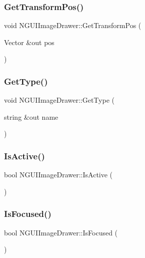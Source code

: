 \subsubsection{\texorpdfstring{Get\+Transform\+Pos()}{GetTransformPos()}}
{\footnotesize\ttfamily void N\+G\+U\+I\+Image\+Drawer\+::\+Get\+Transform\+Pos (\begin{DoxyParamCaption}\item[{Vector \&out}]{pos }\end{DoxyParamCaption})}

\hypertarget{class_n_g_u_i_image_drawer_a57b78d51ac65ee923dcddadd87379baa}{}\label{class_n_g_u_i_image_drawer_a57b78d51ac65ee923dcddadd87379baa} 
\subsubsection{\texorpdfstring{Get\+Type()}{GetType()}}
{\footnotesize\ttfamily void N\+G\+U\+I\+Image\+Drawer\+::\+Get\+Type (\begin{DoxyParamCaption}\item[{string \&out}]{name }\end{DoxyParamCaption})}

\hypertarget{class_n_g_u_i_image_drawer_a51bd7012d812b9ebd598efa88b53d0c3}{}\label{class_n_g_u_i_image_drawer_a51bd7012d812b9ebd598efa88b53d0c3} 
\subsubsection{\texorpdfstring{Is\+Active()}{IsActive()}}
{\footnotesize\ttfamily bool N\+G\+U\+I\+Image\+Drawer\+::\+Is\+Active (\begin{DoxyParamCaption}{ }\end{DoxyParamCaption})}

\hypertarget{class_n_g_u_i_image_drawer_aed9172eed97574a393de7a20bf55e6b0}{}\label{class_n_g_u_i_image_drawer_aed9172eed97574a393de7a20bf55e6b0} 
\subsubsection{\texorpdfstring{Is\+Focused()}{IsFocused()}}
{\footnotesize\ttfamily bool N\+G\+U\+I\+Image\+Drawer\+::\+Is\+Focused (\begin{DoxyParamCaption}{ }\end{DoxyParamCaption})}

